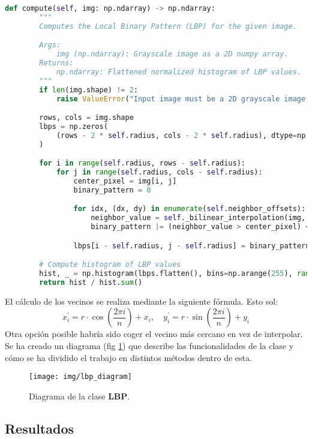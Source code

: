 \documentclass[12pt,letterpaper]{article}
\begin{document}
\begin{lstlisting}[language=python]
    def compute(self, img: np.ndarray) -> np.ndarray:
        """
        Computes the Local Binary Pattern (LBP) for the given image.

        Args:
            img (np.ndarray): Grayscale image as a 2D numpy array.
        Returns:
            np.ndarray: Flattened normalized histogram of LBP values.
        """
        if len(img.shape) != 2:
            raise ValueError("Input image must be a 2D grayscale image.")

        rows, cols = img.shape
        lbps = np.zeros(
            (rows - 2 * self.radius, cols - 2 * self.radius), dtype=np.uint8
        )

        for i in range(self.radius, rows - self.radius):
            for j in range(self.radius, cols - self.radius):
                center_pixel = img[i, j]
                binary_pattern = 0

                for idx, (dx, dy) in enumerate(self.neighbor_offsets):
                    neighbor_value = self._bilinear_interpolation(img, i + dy, j + dx)
                    binary_pattern |= (neighbor_value > center_pixel) << idx

                lbps[i - self.radius, j - self.radius] = binary_pattern

        # Compute histogram of LBP values
        hist, _ = np.histogram(lbps.flatten(), bins=np.arange(255), range=(0, 255))
        return hist / hist.sum()
\end{lstlisting}

El cálculo de los vecinos se realiza mediante la siguiente fórmula. Esto sol:
$$x_i^\prime = r \cdot \cos\left(\frac{2 \pi i}{n}\right)+x_i, \quad
y_i^\prime = r \cdot \sin\left(\frac{2 \pi i}{n}\right)+y_i$$
Otra opción posible habría sido coger el vecino más cercano en vez de interpolar.\\[6pt]
Se ha creado un diagrama (fig \ref{fig:lbp_diagram}) que describe las funcionalidades de la clase y cómo se ha dividido el trabajo en distintos métodos dentro de esta.

\begin{figure}[htp]
    \centering
    \texttt{[image: img/lbp\_diagram]}
    \caption{Diagrama de la clase \textbf{LBP}.}
    \label{fig:lbp_diagram}
\end{figure}

\subsection{Resultados}
\end{document}
